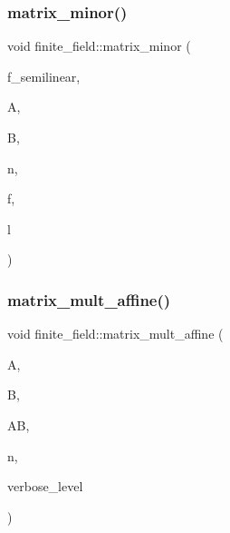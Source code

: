 \mbox{\label{classfinite__field_a1571bc7bc2e600ed0a1e6ccea2ff5be4}} 
\subsubsection{\texorpdfstring{matrix\+\_\+minor()}{matrix\_minor()}}
{\footnotesize\ttfamily void finite\+\_\+field\+::matrix\+\_\+minor (\begin{DoxyParamCaption}\item[{\mbox{\hyperlink{galois_8h_a09fddde158a3a20bd2dcadb609de11dc}{I\+NT}}}]{f\+\_\+semilinear,  }\item[{\mbox{\hyperlink{galois_8h_a09fddde158a3a20bd2dcadb609de11dc}{I\+NT}} $\ast$}]{A,  }\item[{\mbox{\hyperlink{galois_8h_a09fddde158a3a20bd2dcadb609de11dc}{I\+NT}} $\ast$}]{B,  }\item[{\mbox{\hyperlink{galois_8h_a09fddde158a3a20bd2dcadb609de11dc}{I\+NT}}}]{n,  }\item[{\mbox{\hyperlink{galois_8h_a09fddde158a3a20bd2dcadb609de11dc}{I\+NT}}}]{f,  }\item[{\mbox{\hyperlink{galois_8h_a09fddde158a3a20bd2dcadb609de11dc}{I\+NT}}}]{l }\end{DoxyParamCaption})}

\mbox{\label{classfinite__field_aca6f762505a3dd274c7facc0fdd3dde5}} 
\subsubsection{\texorpdfstring{matrix\+\_\+mult\+\_\+affine()}{matrix\_mult\_affine()}}
{\footnotesize\ttfamily void finite\+\_\+field\+::matrix\+\_\+mult\+\_\+affine (\begin{DoxyParamCaption}\item[{\mbox{\hyperlink{galois_8h_a09fddde158a3a20bd2dcadb609de11dc}{I\+NT}} $\ast$}]{A,  }\item[{\mbox{\hyperlink{galois_8h_a09fddde158a3a20bd2dcadb609de11dc}{I\+NT}} $\ast$}]{B,  }\item[{\mbox{\hyperlink{galois_8h_a09fddde158a3a20bd2dcadb609de11dc}{I\+NT}} $\ast$}]{AB,  }\item[{\mbox{\hyperlink{galois_8h_a09fddde158a3a20bd2dcadb609de11dc}{I\+NT}}}]{n,  }\item[{\mbox{\hyperlink{galois_8h_a09fddde158a3a20bd2dcadb609de11dc}{I\+NT}}}]{verbose\+\_\+level }\end{DoxyParamCaption})}

